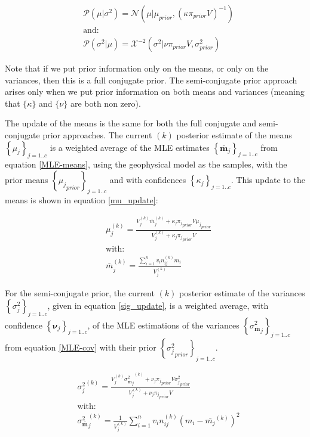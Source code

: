 \documentclass[extra]{gji} %
\begin{document}
\begin{align}
&\mathcal{P}({\mu}| \sigma^2) = \mathcal{N}({\mu}|{\mu}_{prior}, ({\kappa}\pi_{prior}V)^{-1}) \label{mu_semiprior} \\
&\text{and:}\nonumber \\
&\mathcal{P}(\sigma^2|{\mu}) = \mathcal{X}^{-2}(\sigma^2|{\nu}{\pi}_{prior}V,\sigma_{prior}^2) \label{sigma_semiprior}
\end{align}

Note that if we put prior information only on the means, or only on the variances, then this is a full conjugate prior. The semi-conjugate prior approach arises only when we put prior information on both means and variances (meaning that $\{\kappa\}$ and $\{\nu\}$ are both non zero).

The update of the means is the same for both the full conjugate and semi-conjugate prior approaches. The current $(k)$ posterior estimate of the means $\left\{{\mu}_j\right\}_{j=1..c}$ is a weighted average of the MLE estimates $\left\{\bar{\mathbf{m}}_j\right\}_{j=1..c}$ from equation \ref{MLE-means}, using the geophysical model as the samples, with the prior means $\left\{{{\mu}_j}_{prior}\right\}_{j=1..c}$ and with confidences $\left\{\kappa_j\right\}_{j=1..c}$. This update to the means is shown in equation \ref{mu_update}:

\begin{align}
&{\mu}^{(k)}_j=\frac{V_{j}^{(k)}{\bar{{m}}}_j^{(k)} + \kappa_j {\pi_j}_{prior} V {{\mu}_j}_{prior}}{V_{j}^{(k)}+\kappa_j {\pi_j}_{prior} V} \label{mu_update}\\
&\text{with:} \nonumber\\
&{\bar{{m}}}_j^{(k)} = \frac{\sum^n_{i=1} v_i n_{ij}^{(k)} {m}_i}{V_{j}^{(k)}}
\end{align}


For the semi-conjugate prior, the current $(k)$ posterior estimate of the variances $\left\{{\sigma_j^2}\right\}_{j=1..c}$, given in equation \ref{sig_update}, is a weighted average, with confidence $\left\{\mathbf{\nu}_j\right\}_{j=1..c}$, of the MLE estimations of the variances $\left\{{\sigma^2_{\bar{\mathbf{m}}}}_j\right\}_{j=1..c}$ from equation \ref{MLE-cov} with their prior $\left\{{\sigma_j^2}_{prior}\right\}_{j=1..c}$.

\begin{align}
&{\sigma_j^2}^{(k)} = \frac{{{V_{j}^{(k)}} {\sigma^2_{\bar{\mathbf{m}}}}_j}^{(k)} + \nu_j {\pi_j}_{prior} V {\sigma_j^2}_{prior}}
{{V_{j}^{(k)}} + \nu_j {\pi_j}_{prior} V} \label{sig_update}\\
&\text{with:} \nonumber\\
&{\sigma^2_{\bar{\mathbf{m}}}}_j^{(k)} =\frac{1}{{V_{j}^{(k)}}} \sum_{i=1}^{n} v_i n_{ij}^{(k)}({m}_i-\bar{{m}_j}^{(k)})^2
\end{align}
\end{document}
